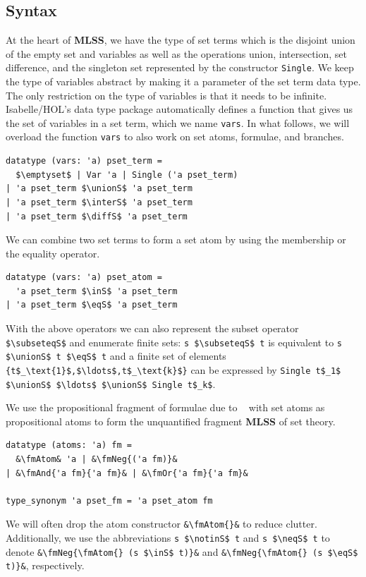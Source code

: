 \documentclass[
  sigplan,
  10pt,
  ]{acmart}
\newcommand{\MLSS}{\textbf{MLSS}}
\newcommand{\unionS}{\sqcup_\text{s}}
\newcommand{\interS}{\sqcap_\text{s}}
\newcommand{\diffS}{-_\text{s}}
\newcommand{\inS}{\in_\text{s}}
\newcommand{\notinS}{\notin_\text{s}}
\newcommand{\eqS}{=_\text{s}}
\newcommand{\neqS}{\neq_\text{s}}
\newcommand{\subseteqS}{\sqsubseteq_\text{s}}
\newcommand{\fmAnd}[2]{#1 $\boldsymbol{\land}$ #2}
\newcommand{\fmOr}[2]{#1 $\boldsymbol{\lor}$ #2}
\newcommand{\fmNegSymbol}{\boldsymbol{\neg}}
\newcommand{\fmNeg}[1]{$\fmNegSymbol$ #1}
\newcommand{\fmAtom}{\textbf{A}}
\begin{document}
\subsection{Syntax}
At the heart of \MLSS{}, we have the type of set terms which is the disjoint union of the empty set and variables as well as the operations union, intersection, set difference, and the singleton set represented by the constructor \lstinline!Single!.
We keep the type of variables abstract by making it a parameter of the set term data type.
The only restriction on the type of variables is that it needs to be infinite.
Isabelle/HOL's data type package automatically defines a function that gives us the set of variables in a set term, which we name \lstinline!vars!.
In what follows, we will overload the function \lstinline!vars! to also work on set atoms, formulae, and branches.
\begin{lstlisting}
datatype (vars: 'a) pset_term =
  $\emptyset$ | Var 'a | Single ('a pset_term)
| 'a pset_term $\unionS$ 'a pset_term
| 'a pset_term $\interS$ 'a pset_term
| 'a pset_term $\diffS$ 'a pset_term
\end{lstlisting}
We can combine two set terms to form a set atom by using the membership or the equality operator.
\begin{lstlisting}
datatype (vars: 'a) pset_atom =
  'a pset_term $\inS$ 'a pset_term
| 'a pset_term $\eqS$ 'a pset_term
\end{lstlisting}
With the above operators we can also represent the subset operator \lstinline!$\subseteqS$! and enumerate finite sets: \lstinline!s $\subseteqS$ t! is equivalent to \lstinline!s $\unionS$ t $\eqS$ t! and a finite set of elements \lstinline!{t$_\text{1}$,$\ldots$,t$_\text{k}$}! can be expressed by \lstinline!Single t$_1$ $\unionS$ $\ldots$ $\unionS$ Single t$_k$!.

We use the propositional fragment of formulae due to \citeauthor{lqe}~\cite{lqe} with set atoms as propositional atoms to form the unquantified fragment \MLSS{} of set theory.
\begin{lstlisting}
datatype (atoms: 'a) fm =
  &\fmAtom& 'a | &\fmNeg{('a fm)}&
| &\fmAnd{'a fm}{'a fm}& | &\fmOr{'a fm}{'a fm}&

type_synonym 'a pset_fm = 'a pset_atom fm
\end{lstlisting}
We will often drop the atom constructor \lstinline!&\fmAtom{}&! to reduce clutter.
Additionally, we use the abbreviations \lstinline!s $\notinS$ t! and \lstinline!s $\neqS$ t! to denote \lstinline!&\fmNeg{\fmAtom{} (s $\inS$ t)}&! and \lstinline!&\fmNeg{\fmAtom{} (s $\eqS$ t)}&!, respectively.
\end{document}
